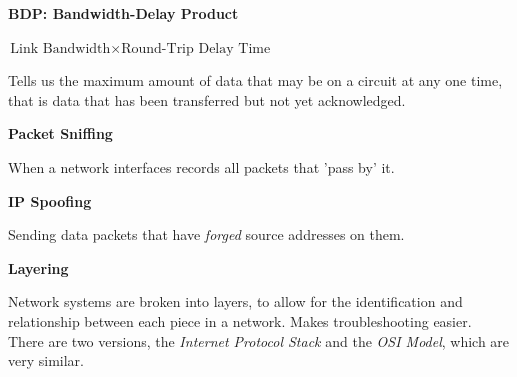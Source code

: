 \documentclass{article}
\begin{document}
\textbf{BDP: Bandwidth-Delay Product}

$\text{Link Bandwidth}\times\text{Round-Trip Delay Time}$

Tells us the maximum amount of data that may be on a circuit at any one time, that is data that has been transferred but not yet acknowledged.

\textbf{Packet Sniffing}

When a network interfaces records all packets that 'pass by' it.

\textbf{IP Spoofing}

Sending data packets that have \textit{forged} source addresses on them.

\textbf{Layering}

Network systems are broken into layers, to allow for the identification and relationship between each piece in a network. Makes troubleshooting easier. There are two versions, the \textit{Internet Protocol Stack} and the \textit{OSI Model}, which are very similar.

\begin{figure}[h]

  \begin{floatrow}

  \quad

  \end{floatrow}
\end{figure}
\end{document}
